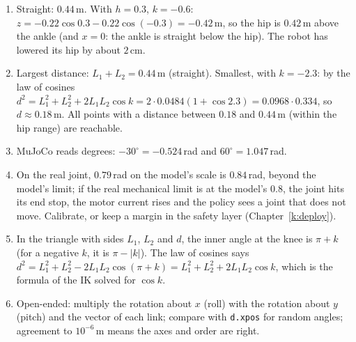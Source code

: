 \begin{enumerate}[label=\textbf{\ansnum.\arabic*}]
  \item Straight: $0.44$\,m. With $h=0.3$, $k=-0.6$: $z=-0.22\cos0.3-0.22\cos(-0.3)=-0.42$\,m, so the hip is $0.42$\,m above the ankle (and $x=0$: the ankle is straight below the hip). The robot has lowered its hip by about $2$\,cm.
  \item Largest distance: $L_1+L_2=0.44$\,m (straight). Smallest, with $k=-2.3$: by the law of cosines $d^2=L_1^2+L_2^2+2L_1L_2\cos k=2\cdot0.0484(1+\cos2.3)=0.0968\cdot0.334$, so $d\approx0.18$\,m. All points with a distance between $0.18$ and $0.44$\,m (within the hip range) are reachable.
  \item MuJoCo reads degrees: $-30^\circ=-0.524$\,rad and $60^\circ=1.047$\,rad.
  \item On the real joint, $0.79$\,rad on the model's scale is $0.84$\,rad, beyond the model's limit; if the real mechanical limit is at the model's $0.8$, the joint hits its end stop, the motor current rises and the policy sees a joint that does not move. Calibrate, or keep a margin in the safety layer (Chapter~\ref{k:deploy}).
  \item In the triangle with sides $L_1$, $L_2$ and $d$, the inner angle at the knee is $\pi+k$ (for a negative $k$, it is $\pi-|k|$). The law of cosines says $d^2=L_1^2+L_2^2-2L_1L_2\cos(\pi+k)=L_1^2+L_2^2+2L_1L_2\cos k$, which is the formula of the IK solved for $\cos k$.
  \item Open-ended: multiply the rotation about $x$ (roll) with the rotation about $y$ (pitch) and the vector of each link; compare with \texttt{d.xpos} for random angles; agreement to $10^{-6}$\,m means the axes and order are right.
\end{enumerate}
